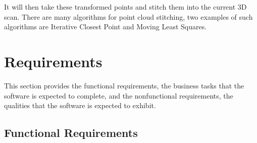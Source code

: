 \documentclass[12pt]{article}
\begin{document}
    It will then take these transformed points and stitch them into the current 3D scan. There are many algorithms for point cloud stitching, two examples of such algorithms are Iterative Closest Point and Moving Least Squares.

\section{Requirements}
\label{sec_Requirements}


This section provides the functional requirements, the business tasks that the
software is expected to complete, and the nonfunctional requirements, the
qualities that the software is expected to exhibit.

\subsection{Functional Requirements}
\end{document}

